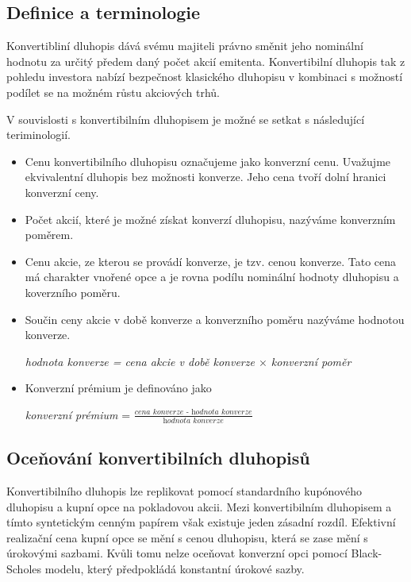 \documentclass[a4paper]{book}
\begin{document}
\subsection{Definice a terminologie}

Konvertibliní dluhopis dává svému majiteli právno směnit jeho nominální hodnotu za určitý předem daný počet akcií emitenta. Konvertibilní dluhopis tak z pohledu investora nabízí bezpečnost klasického dluhopisu v kombinaci s možností podílet se na možném růstu akciových trhů.

V souvislosti s konvertibilním dluhopisem je možné se setkat s následující teriminologií.
\begin{itemize}
\item Cenu konvertibilního dluhopisu označujeme jako konverzní cenu. Uvažujme ekvivalentní dluhopis bez možnosti konverze. Jeho cena tvoří dolní hranici konverzní ceny.
\item Počet akcií, které je možné získat konverzí dluhopisu, nazýváme konverzním poměrem.
\item Cenu akcie, ze kterou se provádí konverze, je tzv. cenou konverze. Tato cena má charakter vnořené opce a je rovna podílu nominální hodnoty dluhopisu a koverzního poměru.
\item Součin ceny akcie v době konverze a konverzního poměru nazýváme hodnotou konverze.
\begin{center}
\textit{hodnota konverze = cena akcie v době konverze $\times$ konverzní poměr}
\end{center}
\item Konverzní prémium je definováno jako
\begin{center}
\textit{konverzní prémium} = $\frac{\textit{cena konverze - hodnota konverze}}{\textit{hodnota konverze}}$
\end{center}
\end{itemize}

\subsection{Oceňování konvertibilních dluhopisů}

Konvertibilního dluhopis lze replikovat pomocí standardního kupónového dluhopisu a kupní opce na pokladovou akcii. Mezi konvertibilním dluhopisem a tímto syntetickým cenným papírem však existuje jeden zásadní rozdíl. Efektivní realizační cena kupní opce se mění s cenou dluhopisu, která se zase mění s úrokovými sazbami. Kvůli tomu nelze oceňovat konverzní opci pomocí Black-Scholes modelu, který předpokládá konstantní úrokové sazby.
\end{document}
